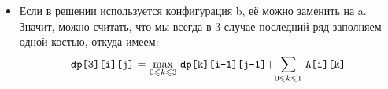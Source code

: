 \documentclass{beamer}
\begin{document}
\begin{frame}
\begin{itemize}
\begin{figure}
    \qquad
\end{figure}

\item Если в решении используется конфигурация b, её можно заменить на a. Значит, можно считать, что мы всегда в 3 случае последний ряд заполняем одной костью, откуда имеем:
\[
\text{\texttt{dp[3][i][j]} = $\max\limits_{0 \leqslant k \leqslant 3}$ \texttt{dp[k][i-1][j-1]}+$\sum\limits_{0 \leqslant k \leqslant 1}$ \texttt{A[i][k]}} 
\]
\end{itemize}
\end{frame}
\end{document}
